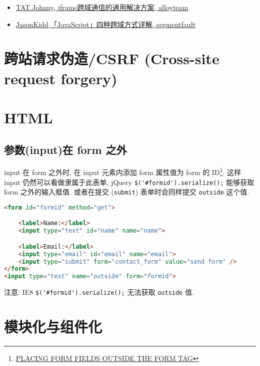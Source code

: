 \begin{itemize}
\tightlist
\item
  \href{http://www.alloyteam.com/2013/11/the-second-version-universal-solution-iframe-cross-domain-communication/}{TAT.Johnny,
  iframe跨域通信的通用解决方案, alloyteam}
\item
  \href{http://segmentfault.com/a/1190000003642057}{JasonKidd,「JavaScript」四种跨域方式详解,
  segmentfault}
\end{itemize}

\section{跨站请求伪造/CSRF (Cross-site request
forgery)}\label{ux8de8ux7ad9ux8bf7ux6c42ux4f2aux9020csrf-cross-site-request-forgery}

\section{HTML}\label{html}

\subsection{参数(input)在 form
之外}\label{ux53c2ux6570inputux5728-form-ux4e4bux5916}

input 在 form 之外时, 在 input 元素内添加 form 属性值为 form 的
ID\footnote{\href{http://www.dreamdealer.nl/articles/form_fields_outside_a_form.html}{PLACING
  FORM FIELDS OUTSIDE THE FORM TAG}}. 这样 input
仍然可以看做隶属于此表单, jQuery \lstinline!$('#formid').serialize();!
能够获取 form 之外的输入框值. 或者在提交 (\lstinline!submit!)
表单时会同样提交 \lstinline!outside! 这个值.

\begin{lstlisting}[language=HTML]
<form id="formid" method="get">

    <label>Name:</label>
    <input type="text" id="name" name="name">

    <label>Email:</label>
    <input type="email" id="email" name="email">
    <input type="submit" form="contact_form" value="send form" />
</form>
<input type="text" name="outside" form="formid">
\end{lstlisting}

注意: IE8 \lstinline!$('#formid').serialize();! 无法获取
\lstinline!outside! 值.

\section{模块化与组件化}\label{ux6a21ux5757ux5316ux4e0eux7ec4ux4ef6ux5316}

